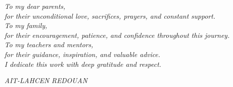 
\vspace*{1.6cm}

\begin{center}
    \begin{minipage}{0.72\textwidth}
        \centering
        {\large\itshape
        To my dear parents,\\[0.45cm]
        for their unconditional love, sacrifices, prayers, and constant support.\\[0.65cm]

        To my family,\\[0.45cm]
        for their encouragement, patience, and confidence throughout this journey.\\[0.65cm]

        To my teachers and mentors,\\[0.45cm]
        for their guidance, inspiration, and valuable advice.\\[0.9cm]

        I dedicate this work with deep gratitude and respect.
        }

        \vspace{1.1cm}

        {\normalsize\itshape AIT-LAHCEN REDOUAN}
    \end{minipage}
\end{center}
